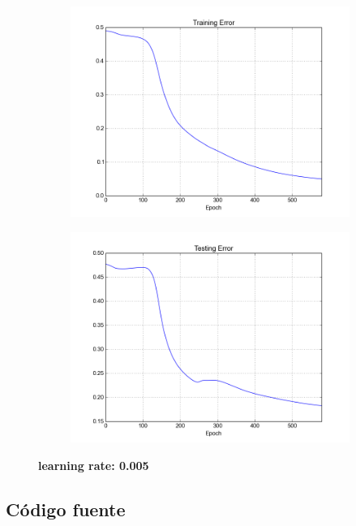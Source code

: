 \begin{figure}[h]	
	\begin{subfigure}[b]{0.5\textwidth}
		\includegraphics[width=\linewidth]{fig/trainingerror_lr0,005_eps0,05_regparam0,00_beta5_batch1.png}
	\end{subfigure}
	\begin{subfigure}[b]{0.5\textwidth}
		\includegraphics[width=\linewidth]{fig/valerror_lr0,005_eps0,05_regparam0,00_beta5_batch1.png}
	\end{subfigure}

	\caption{\textbf{learning rate: 0.005}}
\end{figure}

\newpage
\subsection{Código fuente}

